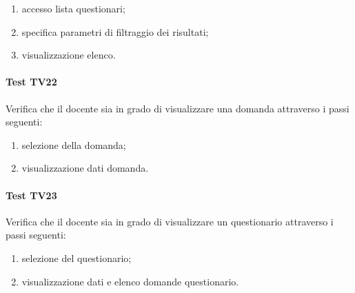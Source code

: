 \documentclass[12pt,a4paper]{article}
\begin{document}
	\begin{enumerate}
		\item accesso lista questionari;
		\item specifica parametri di filtraggio dei risultati;
		\item visualizzazione elenco.
	\end{enumerate}
	\hypertarget{TV22}{}
	\paragraph{Test TV22}
	Verifica che il docente sia in grado di visualizzare una domanda attraverso i passi seguenti: \begin{enumerate} \item selezione della domanda; \item visualizzazione dati domanda. \end{enumerate}
	\hypertarget{TV23}{}
	\paragraph{Test TV23}
	Verifica che il docente sia in grado di visualizzare un questionario attraverso i passi seguenti: \begin{enumerate} \item selezione del questionario; \item visualizzazione dati e elenco domande questionario. \end{enumerate}
	
\end{document}
